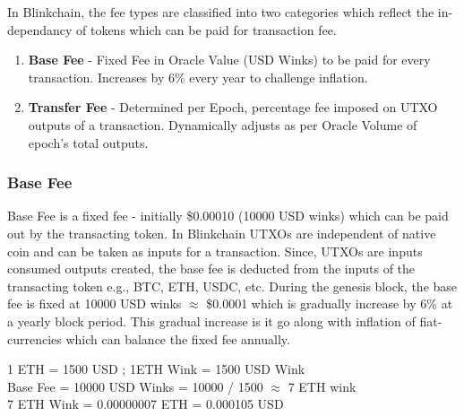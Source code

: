 \documentclass[letterpaper,11pt]{article}
\begin{document}
In Blinkchain, the fee types are classified into two categories which reflect the in-dependancy of tokens which can be paid for transaction fee.
\begin{enumerate}
\item \textbf{Base Fee} - Fixed Fee in Oracle Value (USD Winks) to be paid for every transaction. Increases by 6\% every year to challenge inflation.
\item \textbf{Transfer Fee} - Determined per Epoch, percentage fee imposed on UTXO outputs of a transaction. Dynamically adjusts as per Oracle Volume of epoch's total outputs.
\end{enumerate}

\subsubsection{Base Fee}

Base Fee is a fixed fee - initially \$0.00010 (10000 USD winks) which can be paid out by the transacting token. In Blinkchain UTXOs are independent of native coin and can be taken as inputs for a transaction. Since, UTXOs are inputs consumed outputs created, the base fee is deducted from the inputs of the transacting token e.g., BTC, ETH, USDC, etc. During the genesis block, the base fee is fixed at 10000 USD winks $\approx$ \$0.0001 which is gradually increase by 6\% at a yearly block period. This gradual increase is it go along with inflation of fiat-currencies which can balance the fixed fee annually.\\

\begin{center}
1 ETH = 1500 USD ; 1ETH Wink = 1500 USD Wink\\
Base Fee = 10000 USD Winks = 10000 / 1500 $\approx$ 7 ETH wink\\
7 ETH Wink = 0.00000007 ETH = 0.000105 USD\\
\end{center}
\end{document}
